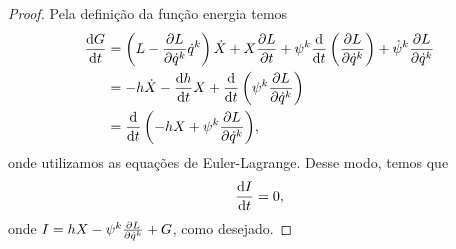 \documentclass[12pt,a4paper]{article}
\begin{document}
\begin{proof}
    Pela definição da função energia temos
    \begin{align*}
        \diff{G}{t} &= \left(L - \diffp{L}{\dot{q}^k}\dot{q}^k\right)\dot{X} + X\diffp{L}{t} + \psi^k\diff*{\left(\diffp{L}{\dot{q}^k}\right)}{t} + \dot{\psi}^k\diffp{L}{\dot{q}^k}\\
                    &= -h \dot{X} - \diff{h}{t}X + \diff*{\left(\psi^k\diffp{L}{\dot{q}^k}\right)}{t}\\
                    &= \diff*{\left(-hX + \psi^k\diffp{L}{\dot{q}^k}\right)}{t},
    \end{align*}
    onde utilizamos as equações de Euler-Lagrange. Desse modo, temos que
    \begin{equation*}
        \diff{I}{t} = 0,
    \end{equation*}
    onde \(I = hX - \psi^k\diffp{L}{\dot{q}^k} + G\), como desejado.
\end{proof}






\end{document}
